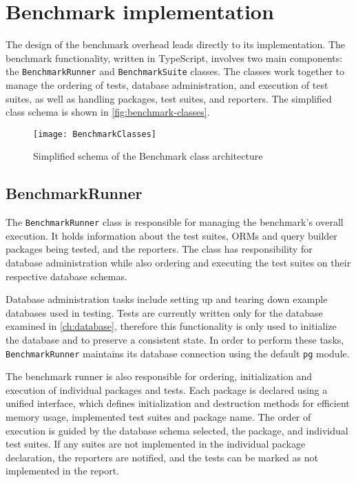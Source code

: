 \chapter{Benchmark implementation}

The design of the benchmark overhead leads directly to its implementation. The
benchmark functionality, written in TypeScript, involves two main components:
the \texttt{BenchmarkRunner} and \texttt{BenchmarkSuite} classes. The classes
work together to manage the ordering of tests, database administration, and
execution of test suites, as well as handling packages, test suites, and
reporters. The simplified class schema is shown in \autoref{fig:benchmark-classes}.

\begin{figure}[hp]
    \caption{Simplified schema of the Benchmark class architecture}
    \centering
    \label{fig:benchmark-classes}
    \texttt{[image: BenchmarkClasses]}
\end{figure}

\section{BenchmarkRunner}

The \texttt{BenchmarkRunner} class is responsible for managing the benchmark’s
overall execution. It holds information about the test suites, ORMs and query
builder packages being tested, and the reporters. The class has responsibility
for database administration while also ordering and executing the test suites on
their respective database schemas.

Database administration tasks include setting up and tearing down example
databases used in testing. Tests are currently written only for the database
examined in \autoref{ch:database}, therefore this functionality is only used to
initialize the database and to preserve a consistent state. In order to perform
these tasks, \texttt{BenchmarkRunner} maintains its database connection using
the default \texttt{pg} module.

The benchmark runner is also responsible for ordering, initialization and
execution of individual packages and tests. Each package is declared using a
unified interface, which defines initialization and destruction methods for
efficient memory usage, implemented test suites and package name. The order of
execution is guided by the database schema selected, the package, and
individual test suites. If any suites are not implemented in the individual
package declaration, the reporters are notified, and the tests can be marked as
not implemented in the report.

